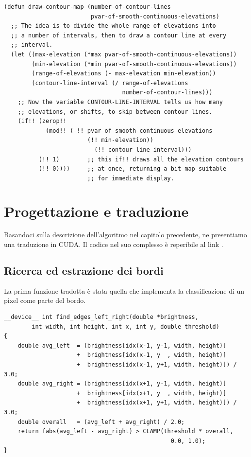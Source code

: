 \documentclass[12pt,a4paper,openright,twoside]{report}
\begin{document}
\begin{lstlisting}[style=mystyle]
(defun draw-contour-map (number-of-contour-lines
                         pvar-of-smooth-continuous-elevations)
  ;; The idea is to divide the whole range of elevations into
  ;; a number of intervals, then to draw a contour line at every
  ;; interval.
  (let ((max-elevation (*max pvar-of-smooth-continuous-elevations))
        (min-elevation (*min pvar-of-smooth-continuous-elevations))
        (range-of-elevations (- max-elevation min-elevation))
        (contour-line-interval (/ range-of-elevations
                                  number-of-contour-lines)))
    ;; Now the variable CONTOUR-LINE-INTERVAL tells us how many
    ;; elevations, or shifts, to skip between contour lines.
    (if!! (zerop!!
            (mod!! (-!! pvar-of-smooth-continuous-elevations
                        (!! min-elevation))
                          (!! contour-line-interval)))
          (!! 1)        ;; this if!! draws all the elevation contours
          (!! 0))))     ;; at once, returning a bit map suitable
                        ;; for immediate display.
\end{lstlisting}

\chapter{Progettazione e traduzione}

Basandoci sulla descrizione dell'algoritmo nel capitolo precedente, ne presentiamo una traduzione in CUDA. Il codice nel suo complesso è reperibile al link \cite{thecode}.

\section{Ricerca ed estrazione dei bordi}

La prima funzione tradotta è stata quella che implementa la classificazione di un pixel come parte del bordo.

\begin{lstlisting}[style=mystyle]
__device__ int find_edges_left_right(double *brightness,
        int width, int height, int x, int y, double threshold)
{
    double avg_left  = (brightness[idx(x-1, y-1, width, height)]
                     +  brightness[idx(x-1, y  , width, height)]
                     +  brightness[idx(x-1, y+1, width, height)]) / 3.0;
    double avg_right = (brightness[idx(x+1, y-1, width, height)]
                     +  brightness[idx(x+1, y  , width, height)]
                     +  brightness[idx(x+1, y+1, width, height)]) / 3.0;
    double overall   = (avg_left + avg_right) / 2.0;
    return fabs(avg_left - avg_right) > CLAMP(threshold * overall,
                                                0.0, 1.0);
}
\end{lstlisting}
\end{document}
